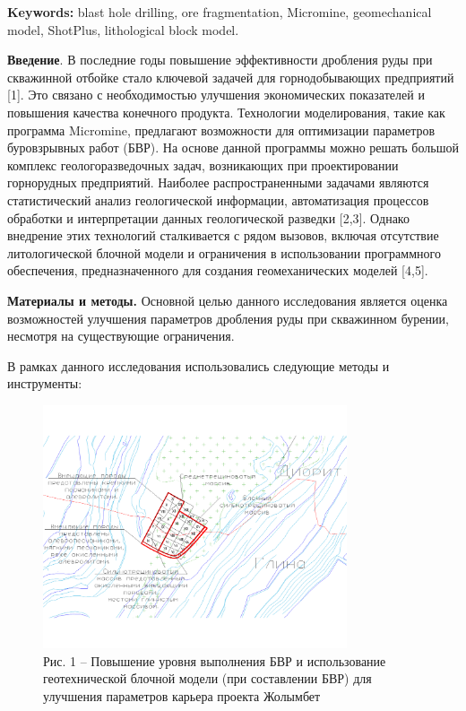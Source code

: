 {\bfseries Keywords:} blast hole drilling, ore fragmentation, Micromine,
geomechanical model, ShotPlus, lithological block model.
\begin{multicols}{2}

{\bfseries Введение}. В последние годы повышение эффективности дробления
руды при скважинной отбойке стало ключевой задачей для горнодобывающих
предприятий {[}1{]}. Это связано с необходимостью улучшения
экономических показателей и повышения качества конечного продукта.
Технологии моделирования, такие как программа Micromine, предлагают
возможности для оптимизации параметров буровзрывных работ (БВР). На
основе данной программы можно решать большой комплекс геологоразведочных
задач, возникающих при проектировании горнорудных предприятий. Наиболее
распространенными задачами являются статистический анализ геологической
информации, автоматизация процессов обработки и интерпретации данных
геологической разведки {[}2,3{]}. Однако внедрение этих технологий
сталкивается с рядом вызовов, включая отсутствие литологической блочной
модели и ограничения в использовании программного обеспечения,
предназначенного для создания геомеханических моделей {[}4,5{]}.

{\bfseries Материалы и методы.} Основной целью данного исследования
является оценка возможностей улучшения параметров дробления руды при
скважинном бурении, несмотря на существующие ограничения.

В рамках данного исследования использовались следующие методы и
инструменты:
\end{multicols}

\begin{figure}[H]
	\centering
	\includegraphics[width=0.8\textwidth]{media/gor/image27}
	\caption*{Рис. 1 -- Повышение уровня выполнения БВР и использование
	геотехнической блочной модели (при составлении БВР) для улучшения
	параметров карьера проекта Жолымбет}
\end{figure}

